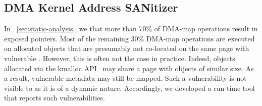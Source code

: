 \subsection{DMA Kernel Address SANitizer}\label{sec:dma-kasan} 

In \DIFdelbegin {}\DIFdelend \DIFaddbegin {}\DIFaddend ~\ref{sec:static-analysis}, we \DIFdelbegin {}\DIFdelend \DIFaddbegin {}\DIFaddend that more than 70\% of DMA-map operations result in exposed pointers. 
Most of the remaining 30\% \DIFaddbegin {}\DIFaddend DMA-map operations are executed on allocated objects that are presumably not co-located on the same page with vulnerable \DIFdelbegin {}\DIFdelend \DIFaddbegin {}\DIFaddend . However, this is often not the case in practice.
Indeed, objects allocated via the kmalloc API~\cite{Cor07} may share a page with objects of similar size. As a result, vulnerable metadata may still be mapped. 
%
Such a vulnerability is not visible to \tool as it is of a dynamic nature. Accordingly, we \DIFdelbegin {}\DIFdelend developed a run-time tool that reports such vulnerabilities. 

